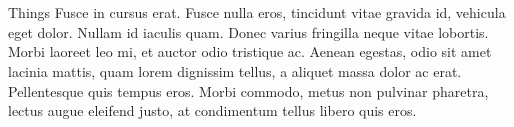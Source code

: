 \documentclass[12pt]{beamer}
\renewcommand{\maketitle}{%
	\begin{center}%
		\Huge\inserttitle\\[7mm]%
		\Large\insertauthor\\[5mm]%
		\Large\insertinstitute%
	\end{center}%
	\vspace*{-2ex}%
}
\begin{document}
\begin{frame}{\maketitle}
\begin{columns}
\begin{column}{.45\textwidth}
\begin{block}{Things}
					Fusce in cursus erat. Fusce nulla eros, tincidunt vitae gravida id, vehicula eget dolor. Nullam id iaculis quam. Donec varius fringilla neque vitae lobortis. Morbi laoreet leo mi, et auctor odio tristique ac. Aenean egestas, odio sit amet lacinia mattis, quam lorem dignissim tellus, a aliquet massa dolor ac erat. Pellentesque quis tempus eros. Morbi commodo, metus non pulvinar pharetra, lectus augue eleifend justo, at condimentum tellus libero quis eros.
				\end{block}
			\end{column}
		\end{columns}
	\end{frame}
\centering
\end{document}
